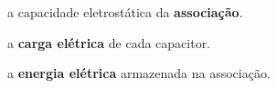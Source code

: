 \documentclass{yagoexam}
\begin{document}
\begin{questions}
		\begin{parts}
			
			\item a capacidade eletrostática da \textbf{associação}.
			\vspace{2.2cm}
			
			\item a \textbf{carga elétrica} de cada capacitor.
			\vspace{2.2cm}
			
			\item a \textbf{energia elétrica} armazenada na associação.
			
		\end{parts}
		
		
	\end{questions}
\end{document}
